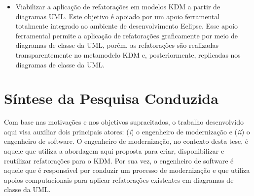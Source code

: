 \begin{itemize}
	
    
    \item Viabilizar a aplicação de refatorações em modelos KDM a partir de diagramas UML. Este objetivo é apoiado por um apoio ferramental totalmente integrado ao ambiente de desenvolvimento Eclipse. Esse apoio ferramental permite a aplicação de refatorações graficamente por meio de diagramas de classe da UML, porém, as refatorações são realizadas transparentemente no metamodelo KDM e, posteriormente, replicadas nos diagramas de classe da UML. 
    	

\end{itemize}

\section{Síntese da Pesquisa Conduzida}\label{sec:introducao:a_abordagem_desenvolvida}

Com base nas motivações e nos objetivos supracitados, o trabalho desenvolvido aqui visa auxiliar dois principais atores: (\textit{i}) o engenheiro de modernização e (\textit{ii}) o engenheiro de software. O engenheiro de modernização, no contexto desta tese, é aquele que utiliza a abordagem aqui proposta para criar, disponibilizar e reutilizar refatorações para o KDM. Por sua vez, o engenheiro de software é aquele que é responsável por conduzir um processo de modernização e que utiliza apoios computacionais para aplicar refatorações existentes em diagramas de classe da UML.





